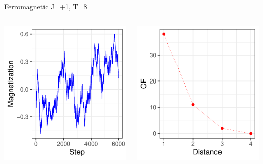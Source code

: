 \documentclass{beamer}
\begin{document}
\begin{frame}{Ferromagnetic J=+1, T=8}
\begin{columns}
\begin{column}{0.5\textwidth}
    \begin{center}
     \includegraphics[width=\textwidth]{Pic/J+1_10_6000_T=8_Magnetization.pdf}
     \end{center}
\end{column}
\begin{column}{0.5\textwidth}
    \begin{center}
     \includegraphics[width=\textwidth]{Pic/J+1_10_6000_T=8_Coherence.pdf}

\end{center}
\end{column}
\end{columns}
\end{frame}
\end{document}
